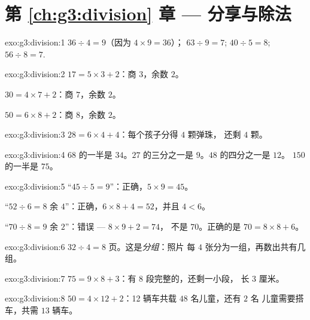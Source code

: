 \section*{第 \ref{ch:g3:division} 章 --- 分享与除法}

\begin{solution}{exo:g3:division:1}
$36 \div 4 = 9$（因为 $4 \times 9 = 36$）；\quad
$63 \div 9 = 7$; \quad $40 \div 5 = 8$; \quad $56 \div 8 = 7$.
\end{solution}

\begin{solution}{exo:g3:division:2}
$17 = 5 \times 3 + 2$：商 $3$，余数 $2$。

$30 = 4 \times 7 + 2$：商 $7$，余数 $2$。

$50 = 6 \times 8 + 2$：商 $8$，余数 $2$。
\end{solution}

\begin{solution}{exo:g3:division:3}
$28 = 6 \times 4 + 4$：每个孩子分得 $4$ 颗弹珠，
还剩 $4$ 颗。
\end{solution}

\begin{solution}{exo:g3:division:4}
$68$ 的一半是 $34$。$27$ 的三分之一是 $9$。$48$ 的四分之一是 $12$。
$150$ 的一半是 $75$。
\end{solution}

\begin{solution}{exo:g3:division:5}
“$45 \div 5 = 9$”：正确，$5 \times 9 = 45$。

“$52 \div 6 = 8$ 余 $4$”：正确，$6 \times 8 + 4 = 52$，并且
$4 < 6$。

“$70 \div 8 = 9$ 余 $2$”：错误 --- $8 \times 9 + 2 = 74$，
不是 $70$。正确的是 $70 = 8 \times 8 + 6$。
\end{solution}

\begin{solution}{exo:g3:division:6}
$32 \div 4 = 8$ 页。这是\emph{分组}：照片
每 $4$ 张分为一组，再数出共有几组。
\end{solution}

\begin{solution}{exo:g3:division:7}
$75 = 9 \times 8 + 3$：有 8 段完整的，还剩一小段，
长 $3$ 厘米。
\end{solution}

\begin{solution}{exo:g3:division:8}
$50 = 4 \times 12 + 2$：12 辆车共载 $48$ 名儿童，还有 $2$ 名
儿童需要搭车，共需 $13$ 辆车。
\end{solution}

